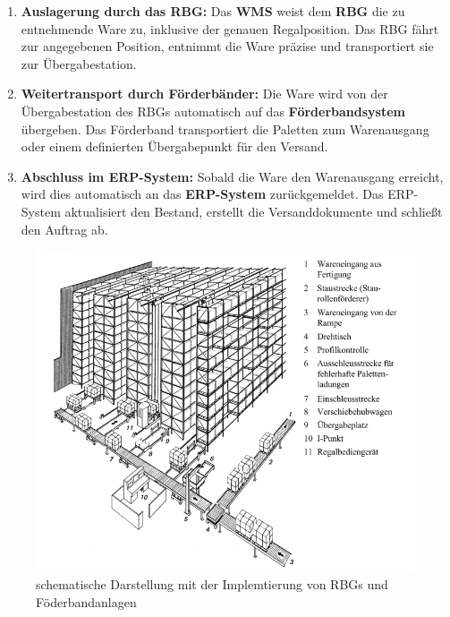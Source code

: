 \begin{enumerate}
	\item \textbf{Auslagerung durch das RBG:}  
	Das \textbf{WMS} weist dem \textbf{RBG} die zu entnehmende Ware zu, inklusive der genauen Regalposition. Das RBG fährt zur angegebenen Position, entnimmt die Ware präzise und transportiert sie zur Übergabestation.
	
	\item \textbf{Weitertransport durch Förderbänder:}  
	Die Ware wird von der Übergabestation des RBGs automatisch auf das \textbf{Förderbandsystem} übergeben. Das Förderband transportiert die Paletten zum Warenausgang oder einem definierten Übergabepunkt für den Versand.
	
	\item \textbf{Abschluss im ERP-System:}  
	Sobald die Ware den Warenausgang erreicht, wird dies automatisch an das \textbf{ERP-System} zurückgemeldet. Das ERP-System aktualisiert den Bestand, erstellt die Versanddokumente und schließt den Auftrag ab.
	
\end{enumerate}

\begin{figure}[H]
	\centering
	\includegraphics[width=0.7\linewidth]{images/skizze-Aufbau}
	\caption[Schematische Darstellung des Hochregallagers \autocites{Martin2021} ] {schematische Darstellung mit der Implemtierung von RBGs und Föderbandanlagen}
	\label{fig:skizze-aufbau}
\end{figure}
\autocites{Martin2021}